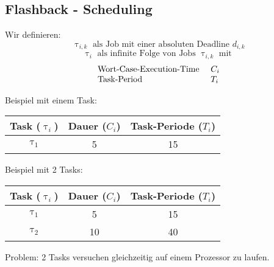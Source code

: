 \subsection{Flashback - Scheduling}
\begin{frame}{\subsecname}
	Wir definieren:
	\begin{equation}
		\uptau_{i, k} \text{ als Job mit einer absoluten Deadline } d_{i, k}
	\end{equation}
	\pause
	\begin{equation}
		\uptau_i \text{ als infinite Folge von Jobs } \uptau_{i, k} \text{ mit }
	\end{equation}
	\pause
	\begin{equation}
		\begin{array}{l l l}
			\text{Wort-Case-Execution-Time } & C_i\\
			\text{Task-Period } & T_i
		\end{array}
	\end{equation}
\end{frame}

Beispiel mit einem Task:
\begin{frame}{\subsecname}
	\begin{center}
		\begin{tabular}{c||c|c}
			Task ($\uptau_i$) & Dauer ($C_i$) & Task-Periode ($T_i$)\\\hline\hline
			$\uptau_1$ & 5 & 15
		\end{tabular}
	\end{center}
	
\end{frame}
\newpage
Beispiel mit 2 Tasks:
\begin{frame}{\subsecname}
	\begin{center}
		\begin{tabular}{c||c|c}
				Task ($\uptau_i$) & Dauer ($C_i$) & Task-Periode ($T_i$)\\\hline\hline
				$\uptau_1$ & 5 & 15\\
				$\uptau_2$ & 10 & 40\\
		\end{tabular}
	\end{center}	
	
	Problem: 2 Tasks versuchen gleichzeitig auf einem Prozessor zu laufen.
\end{frame}

